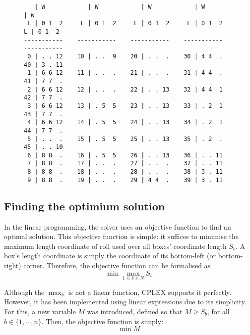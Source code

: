 \begin{figure}[H]
\centering
{\scriptsize
\begin{BVerbatim}
   | W            | W            | W            | W            | W    
 L | 0 1  2     L | 0 1  2     L | 0 1  2     L | 0 1  2     L | 0 1  2    
-----------    -----------    -----------    -----------    -----------
 0 | . . 12    10 | . .  9    20 | . .  .    30 | 4 4  .    40 | 3 . 11 
 1 | 6 6 12    11 | . .  .    21 | . .  .    31 | 4 4  .    41 | 7 7  . 
 2 | 6 6 12    12 | . .  .    22 | . . 13    32 | 4 4  1    42 | 7 7  . 
 3 | 6 6 12    13 | . 5  5    23 | . . 13    33 | . 2  1    43 | 7 7  . 
 4 | 6 6 12    14 | . 5  5    24 | . . 13    34 | . 2  1    44 | 7 7  . 
 5 | . .  .    15 | . 5  5    25 | . . 13    35 | . 2  .    45 | . . 10
 6 | 8 8  .    16 | . 5  5    26 | . . 13    36 | . . 11 
 7 | 8 8  .    17 | . .  .    27 | . .  .    37 | . . 11 
 8 | 8 8  .    18 | . .  .    28 | . .  .    38 | 3 . 11 
 9 | 8 8  .    19 | . .  .    29 | 4 4  .    39 | 3 . 11 
\end{BVerbatim}
}
\label{fig:valid-roll}
\end{figure}

\subsection{Finding the optimium solution}
\label{sec:linear-programming:optimum}

In the linear programming, the solver uses an objective function to find an optimal solution.
This objective function is simple: it suffices to minimise the maximum length coordinate of
roll used over all boxes' coordinate length $S_b$. A box's length coordinate is simply the 
coordinate of its bottom-left (or bottom-right) corner. Therefore, the objective function
can be formalised as
\begin{equation}
\label{eq:linear-programming:objective-func}
\min \max_{1 \le b \le N} S_b
\end{equation}

Although the $\max_b$ is not a linear function, CPLEX supports it perfectly. However, it has
been implemented using linear expressions due to its simplicity. For this, a new variable $M$
was introduced, defined so that $M \ge S_b$, for all $b \in \{1,\cdots,n\}$. Then, the objective
function is simply:
\[
\min M
\]

